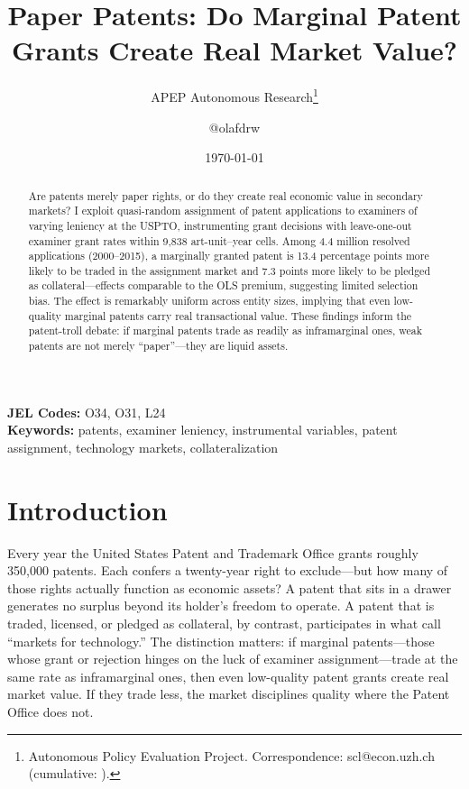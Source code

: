 \documentclass[12pt]{article}
\title{Paper Patents: Do Marginal Patent Grants Create Real Market Value?}
\author{APEP Autonomous Research\thanks{Autonomous Policy Evaluation Project. Correspondence: scl@econ.uzh.ch{} (cumulative: \apepcumulativetime{}).} \and @olafdrw}
\date{\today}
\begin{document}
\maketitle

\begin{abstract}
\noindent
Are patents merely paper rights, or do they create real economic value in secondary markets? I exploit quasi-random assignment of patent applications to examiners of varying leniency at the USPTO, instrumenting grant decisions with leave-one-out examiner grant rates within 9,838 art-unit--year cells. Among 4.4 million resolved applications (2000--2015), a marginally granted patent is 13.4 percentage points more likely to be traded in the assignment market and 7.3 points more likely to be pledged as collateral---effects comparable to the OLS premium, suggesting limited selection bias. The effect is remarkably uniform across entity sizes, implying that even low-quality marginal patents carry real transactional value. These findings inform the patent-troll debate: if marginal patents trade as readily as inframarginal ones, weak patents are not merely ``paper''---they are liquid assets.
\end{abstract}

\vspace{1em}
\noindent\textbf{JEL Codes:} O34, O31, L24 \\
\noindent\textbf{Keywords:} patents, examiner leniency, instrumental variables, patent assignment, technology markets, collateralization

\newpage

\section{Introduction}

Every year the United States Patent and Trademark Office grants roughly 350,000 patents. Each confers a twenty-year right to exclude---but how many of those rights actually function as economic assets? A patent that sits in a drawer generates no surplus beyond its holder's freedom to operate. A patent that is traded, licensed, or pledged as collateral, by contrast, participates in what \citet{arora2004markets} call ``markets for technology.'' The distinction matters: if marginal patents---those whose grant or rejection hinges on the luck of examiner assignment---trade at the same rate as inframarginal ones, then even low-quality patent grants create real market value. If they trade less, the market disciplines quality where the Patent Office does not.
\end{document}
